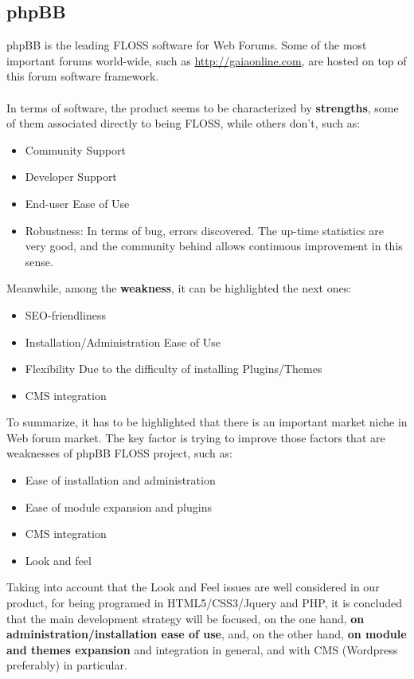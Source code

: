 \documentclass[11pt]{article}
\begin{document}
\subsection{phpBB}
phpBB is the leading FLOSS software for Web Forums. Some of the most important forums world-wide, such as \url{http://gaiaonline.com}, are hosted on top of this forum software framework.\\
\\
In terms of software, the product seems to be characterized by \textbf{strengths}, some of them associated directly to being FLOSS, while others don't, such as:
\begin{itemize}\itemsep0pt
\item{Community Support}
\item{Developer Support}
\item{End-user Ease of Use}
\item{Robustness}: In terms of bug, errors discovered. The up-time statistics are very good, and the community behind allows continuous improvement in this sense.
\end{itemize}
Meanwhile, among the \textbf{weakness}, it can be highlighted the next ones:
\begin{itemize}\itemsep0pt
\item{SEO-friendliness}
\item{Installation/Administration Ease of Use}
\item{Flexibility} Due to the difficulty of installing Plugins/Themes
\item{CMS integration}
\end{itemize}
To summarize, it has to be highlighted that there is an important market niche in Web forum market. The key factor is trying to improve those factors that are weaknesses of phpBB FLOSS project, such as:
\begin{itemize}\itemsep0pt
\item{Ease of installation and administration}
\item{Ease of module expansion and plugins}
\item{CMS integration}
\item{Look and feel}
\end{itemize}
Taking into account that the Look and Feel issues are well considered in our product, for being programed in HTML5/CSS3/Jquery and PHP, it is concluded that the main development strategy will be focused, on the one hand, \textbf{on administration/installation ease of use}, and, on the other hand, \textbf{on module and themes expansion} and integration in general, and with CMS (Wordpress preferably) in particular.
\end{document}
